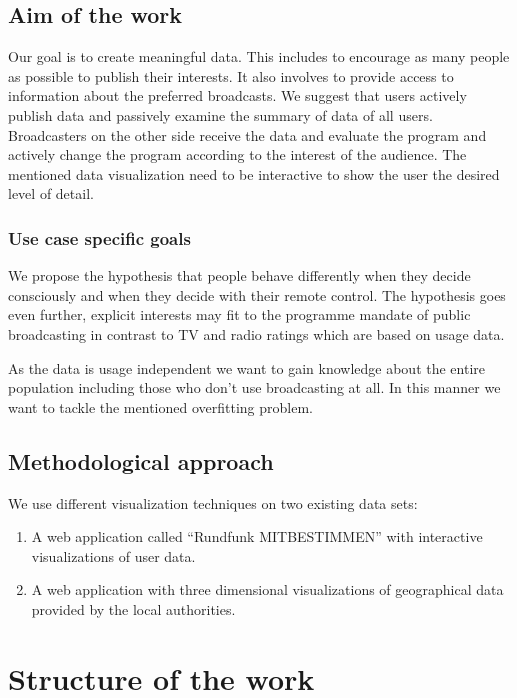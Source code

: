 \documentclass{article}
\begin{document}
\subsection{Aim of the work}
Our goal is to create meaningful data.
This includes to encourage as many people as possible to publish their interests.
It also involves to provide access to information about the preferred broadcasts.
We suggest that users actively publish data and passively examine the summary of data of all users.
Broadcasters on the other side receive the data and evaluate the program and actively change the program according to the interest of the audience.
The mentioned data visualization need to be interactive to show the user the desired level of detail.

\subsubsection{Use case specific goals}
We propose the hypothesis that people behave differently when they decide consciously and when they decide with their remote control.
The hypothesis goes even further, explicit interests may fit to the programme mandate of public broadcasting in contrast to TV and radio ratings which are based on usage data.

As the data is usage independent we want to gain knowledge about the entire population including those who don't use broadcasting at all.
In this manner we want to tackle the mentioned overfitting problem.

\subsection{Methodological approach}

We use different visualization techniques on two existing data sets:
\begin{enumerate}
  \item
    A web application called ``Rundfunk MITBESTIMMEN'' with interactive visualizations of user data.
  \item
    A web application with three dimensional visualizations of geographical data provided by the local authorities.
\end{enumerate}

\section{Structure of the work}
\end{document}
